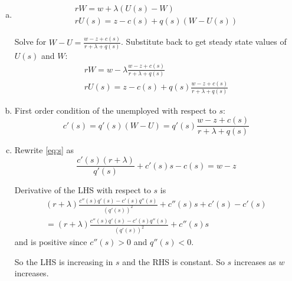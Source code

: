 \documentclass{article}
\begin{document}
\section{}
\begin{enumerate}[(a)]
\item
  \begin{gather*}
    rW=w+\lambda(U(s)-W)\\
    rU(s)=z-c(s)+q(s)(W-U(s))
  \end{gather*}

  Solve for $W-U = \frac{w-z+c(s)}{r+\lambda+q(s)}$. Substitute back
  to get steady state values of $U(s)$ and $W$:
\begin{gather*}
  rW = w-\lambda\frac{w-z+c(s)}{r+\lambda+q(s)}\\
  rU(s)=z-c(s)+q(s)\frac{w-z+c(s)}{r+\lambda+q(s)}
\end{gather*}

\item First order condition of the unemployed with respect to $s$:
  \begin{equation}\label{eq:s}
    c'(s)=q'(s)(W-U)=q'(s)\frac{w-z+c(s)}{r+\lambda+q(s)}
  \end{equation}

\item Rewrite \eqref{eq:s} as
  \begin{equation*}
    \frac{c'(s)(r+\lambda)}{q'(s)}+c'(s)s-c(s)=w-z
  \end{equation*}

  Derivative of the LHS with respect to $s$ is
  \begin{align*}
    (r+\lambda)\frac{c''(s)q'(s)-c'(s)q''(s)}{(q'(s))^2}+c''(s)s+c'(s)-c'(s)\\
    =(r+\lambda)\frac{c''(s)q'(s)-c'(s)q''(s)}{(q'(s))^2}+c''(s)s
  \end{align*}
  and is positive since $c''(s)>0$ and $q''(s)<0$.

  So the LHS is increasing in $s$ and the RHS is constant. So $s$
  increases as $w$ increases.

\end{enumerate}

\section{}
\end{document}
